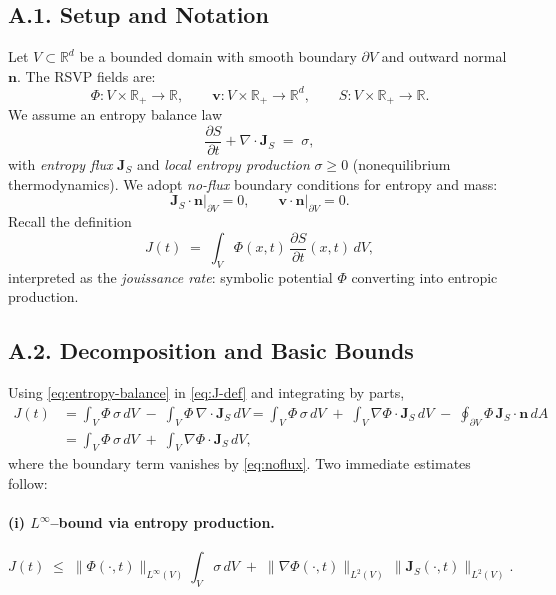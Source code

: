 \documentclass[12pt,a4paper]{article}
\begin{document}
\subsection*{A.1. Setup and Notation}
Let $V\subset\mathbb{R}^d$ be a bounded domain with smooth boundary $\partial V$ and outward normal $\mathbf{n}$. The RSVP fields are:
\[
\Phi:V\times\mathbb{R}_+\!\to\!\mathbb{R},\qquad
\mathbf{v}:V\times\mathbb{R}_+\!\to\!\mathbb{R}^d,\qquad
S:V\times\mathbb{R}_+\!\to\!\mathbb{R}.
\]
We assume an entropy balance law
\begin{equation}
\label{eq:entropy-balance}
\frac{\partial S}{\partial t} + \nabla\!\cdot \mathbf{J}_S \;=\; \sigma,
\end{equation}
with \emph{entropy flux} $\mathbf{J}_S$ and \emph{local entropy production} $\sigma\ge 0$ (nonequilibrium thermodynamics). We adopt \emph{no-flux} boundary conditions for entropy and mass:
\begin{equation}
\label{eq:noflux}
\mathbf{J}_S\cdot \mathbf{n}\big|_{\partial V} = 0,
\qquad
\mathbf{v}\cdot \mathbf{n}\big|_{\partial V}=0.
\end{equation}
Recall the definition
\begin{equation}
\label{eq:J-def}
J(t)\;=\;\int_V \Phi(x,t)\,\frac{\partial S}{\partial t}(x,t)\,dV,
\end{equation}
interpreted as the \emph{jouissance rate}: symbolic potential \(\Phi\) converting into entropic production.

\subsection*{A.2. Decomposition and Basic Bounds}
Using \eqref{eq:entropy-balance} in \eqref{eq:J-def} and integrating by parts,
\begin{align}
J(t)
&= \int_V \Phi\,\sigma\,dV \;-\; \int_V \Phi\,\nabla\!\cdot \mathbf{J}_S\,dV
= \int_V \Phi\,\sigma\,dV \;+\; \int_V \nabla\Phi \cdot \mathbf{J}_S\,dV \;-\; \oint_{\partial V}\!\Phi\,\mathbf{J}_S\!\cdot\!\mathbf{n}\,dA \nonumber\\
&= \int_V \Phi\,\sigma\,dV \;+\; \int_V \nabla\Phi \cdot \mathbf{J}_S\,dV,
\label{eq:J-decomp}
\end{align}
where the boundary term vanishes by \eqref{eq:noflux}. Two immediate estimates follow:

\paragraph{(i) $L^\infty$–bound via entropy production.}
\begin{equation}
\label{eq:Linfty-bound}
J(t) \;\le\; \|\Phi(\cdot,t)\|_{L^\infty(V)} \int_V \sigma\,dV \;+\; \|\nabla\Phi(\cdot,t)\|_{L^2(V)}\,\|\mathbf{J}_S(\cdot,t)\|_{L^2(V)}.
\end{equation}
\end{document}
